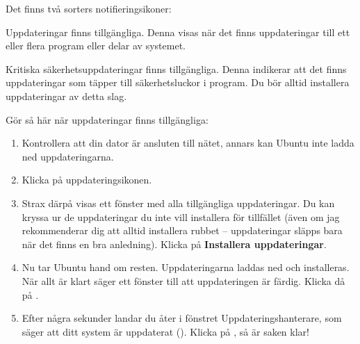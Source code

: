 \documentclass[a4paper,final]{memoir} %
\begin{document}
Det finns två sorters notifieringsikoner:

\medskip


\medskip

Uppdateringar finns tillgängliga. Denna visas när det finns uppdateringar till ett eller flera program eller delar av systemet. 

\medskip


\medskip

Kritiska säkerhetsuppdateringar finns tillgängliga. Denna indikerar att det finns uppdateringar som täpper till säkerhetsluckor i program. Du bör alltid installera uppdateringar av detta slag.


Gör så här när uppdateringar finns tillgängliga:

\begin{enumerate}

\item Kontrollera att din dator är ansluten till nätet, annars kan Ubuntu inte ladda ned uppdateringarna. 

\item Klicka på uppdateringsikonen.

\item Strax därpå visas ett fönster med alla tillgängliga uppdateringar. Du kan kryssa ur de uppdateringar du inte vill installera för tillfället (även om jag rekommenderar dig att alltid installera rubbet -- uppdateringar släpps bara när det finns en bra anledning). Klicka på \textbf{Installera uppdateringar}.

\item Nu tar Ubuntu hand om resten. Uppdateringarna laddas ned och installeras. När allt är klart säger ett fönster till att uppdateringen är färdig. Klicka då på \xstang{}. 

\item Efter några sekunder landar du åter i fönstret Uppdateringshanterare, som säger att ditt system är uppdaterat (). Klicka på \xstang{}, så är saken klar!

\end{enumerate}
\end{document}
